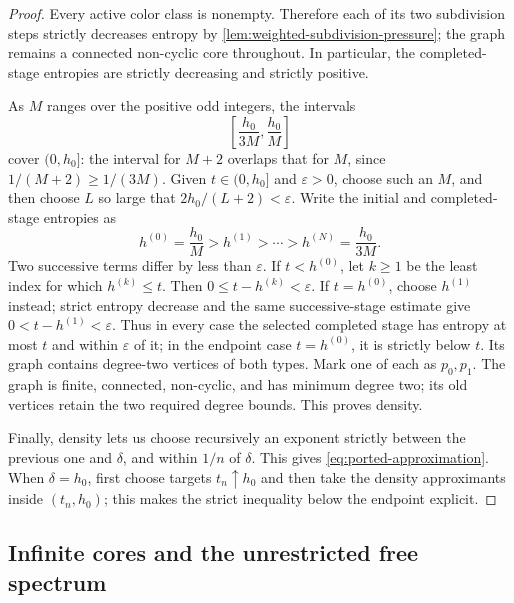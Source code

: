 \documentclass[11pt]{amsart}
\theoremstyle{plain}
\theoremstyle{definition}
\theoremstyle{remark}
\begin{document}
\begin{proof}
Every active color class is nonempty.  Therefore each of its two subdivision
steps strictly decreases entropy by
\cref{lem:weighted-subdivision-pressure}; the graph remains a connected
non-cyclic core throughout.  In particular, the completed-stage entropies are
strictly decreasing and strictly positive.

As \(M\) ranges over the positive odd integers, the intervals
\begin{equation}\label{eq:typed-density-intervals}
  \left[\frac{h_0}{3M},\frac{h_0}{M}\right]
\end{equation}
cover \((0,h_0]\): the interval for \(M+2\) overlaps that for \(M\), since
\(1/(M+2)\geq1/(3M)\).  Given \(t\in(0,h_0]\) and \(\varepsilon>0\), choose
such an \(M\), and then choose \(L\) so large that
\(2h_0/(L+2)<\varepsilon\).  Write the initial and completed-stage entropies as
\[
  h^{(0)}=\frac{h_0}{M}>h^{(1)}>\cdots>h^{(N)}
  =\frac{h_0}{3M}.
\]
Two successive terms differ by less than \(\varepsilon\).  If \(t<h^{(0)}\),
let \(k\geq1\) be the least index for which \(h^{(k)}\leq t\).  Then
\(0\leq t-h^{(k)}<\varepsilon\).  If \(t=h^{(0)}\), choose \(h^{(1)}\)
instead; strict entropy decrease and the same successive-stage estimate give
\(0<t-h^{(1)}<\varepsilon\).  Thus in every case the selected completed stage
has entropy at most \(t\) and within \(\varepsilon\) of it; in the endpoint
case \(t=h^{(0)}\), it is strictly below \(t\).  Its graph
contains degree-two vertices of both types.  Mark
one of each as \(p_0,p_1\).  The
graph is finite, connected, non-cyclic, and has minimum degree two; its old
vertices retain the two required degree bounds.  This proves density.

Finally, density lets us choose recursively an exponent strictly between the
previous one and \(\delta\), and within \(1/n\) of \(\delta\).  This gives
\eqref{eq:ported-approximation}.  When \(\delta=h_0\), first choose
targets \(t_n\uparrow h_0\) and then take the density approximants inside
\((t_n,h_0)\); this makes the strict inequality below the endpoint
explicit.
\end{proof}

\subsection{Infinite cores and the unrestricted free spectrum}
\end{document}
